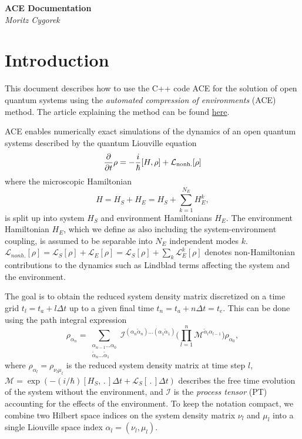 \documentclass{scrartcl}
\begin{document}
\begin{center}
\textbf{\LARGE ACE Documentation}\\[2mm]
\textit{\Large Moritz Cygorek}
\end{center}
\section{Introduction}
This document describes how to use the C++ code ACE
for the solution of open quantum systems using the 
\emph{automated compression of environments} (ACE) method.
The article explaining the method can be found 
\href{https://doi.org/10.1038/s41567-022-01544-9}{here}.

ACE enables numerically exact simulations of the dynamics of 
an open quantum systems described by the quantum Liouville equation
\begin{equation}
\frac{\partial}{\partial t} \rho=-\frac i\hbar [ H , \rho ] 
+\mathcal{L}_\textnormal{nonh.}[\rho]
\end{equation}
where the microscopic Hamiltonian 
\begin{equation}
H=H_S+H_E = H_S +\sum_{k=1}^{N_E} H_E^k,
\end{equation}
is split up into system $H_S$ and environment Hamiltonians $H_E$.
The environment Hamiltonian $H_E$, 
which we define as also including the system-environment coupling, 
is assumed to be separable into $N_E$ independent modes $k$. 
$\mathcal{L}_{nonh.}[\rho]=\mathcal{L}_S[\rho]+\mathcal{L}_E[\rho]
=\mathcal{L}_S[\rho]+\sum_k \mathcal{L}_E^k [\rho]$ 
denotes non-Hamiltonian contributions
to the dynamics such as Lindblad terms affecting the system 
and the environment.

The goal is to obtain the reduced system density matrix discretized on
a time grid $t_l = t_a + l \Delta t$ up to a given final time 
$t_n = t_a + n \Delta t = t_e$.
This can be done using the path integral expression
\begin{equation}
{\rho}_{\alpha_n}=
\sum_{\substack{\alpha_{n-1}\dots\alpha_0 \\
\tilde{\alpha}_n\dots\tilde{\alpha}_1}}
\mathcal{I}^{(\alpha_{n}\tilde{\alpha}_n)\dots(\alpha_1\tilde{\alpha}_1)}
\bigg(\prod_{l=1}^{n}
\mathcal{M}^{\tilde{\alpha}_{l}\alpha_{l-1}} \bigg)
{\rho}_{\alpha_0},
\end{equation}
where ${\rho}_{\alpha_l}={\rho}_{\nu_l \mu_l}$ is the reduced 
system density matrix at time step $l$, 
$\mathcal{M}=\exp( -(i/\hbar)[H_S, \,.\, ] \Delta t
+\mathcal{L}_S[\,.\,]\Delta t)$ describes the
free time evolution of the system without the environment, 
and $\mathcal{I}$ is the 
\emph{process tensor} (PT) accounting for the 
effects of the environment.
To keep the notation compact, we combine two Hilbert space indices
on the system density matrix $\nu_l$ and $\mu_l$ into a single 
Liouville space index $\alpha_l=(\nu_l, \mu_l)$.
\end{document}

